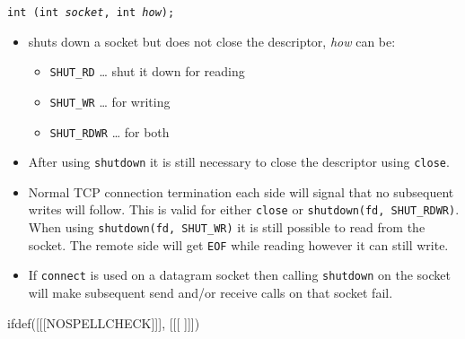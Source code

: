 \begin{slide}
\texttt{int (int \emph{socket}, int \emph{how});}
\begin{itemize}
\item shuts down a socket but does not close the descriptor, \emph{how} can be: 
    \begin{itemize}
    \item \texttt{SHUT\_RD} \dots{} shut it down for reading
    \item \texttt{SHUT\_WR} \dots{} for writing
    \item \texttt{SHUT\_RDWR} \dots{} for both
    \end{itemize}
\end{itemize}
\end{slide}

\begin{itemize}
\item After using \texttt{shutdown} it is still necessary to close the
descriptor using \texttt{close}.
\item Normal TCP connection termination each side will signal that no subsequent
writes will follow. This is valid for either \texttt{close} or
\texttt{shutdown(fd, SHUT\_RDWR)}. When using
\texttt{shutdown(fd, SHUT\_WR)} it is still possible to read from the socket.
The remote side will get \texttt{EOF} while reading however it can still write.
\item If \texttt{connect} is used on a datagram socket then calling
\texttt{shutdown} on the socket will make subsequent send and/or receive calls
on that socket fail.
\end{itemize}


ifdef([[[NOSPELLCHECK]]], [[[
]]])

